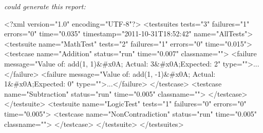 {\itshape could generate this report\+:}

{\itshape 
\begin{DoxyCode}
<?\textcolor{keyword}{xml} \textcolor{keyword}{version}=\textcolor{stringliteral}{"1.0"} \textcolor{keyword}{encoding}=\textcolor{stringliteral}{"UTF-8"}?>
<\textcolor{keywordtype}{testsuites} \textcolor{keyword}{tests}=\textcolor{stringliteral}{"3"} \textcolor{keyword}{failures}=\textcolor{stringliteral}{"1"} \textcolor{keyword}{errors}=\textcolor{stringliteral}{"0"} \textcolor{keyword}{time}=\textcolor{stringliteral}{"0.035"} \textcolor{keyword}{timestamp}=\textcolor{stringliteral}{"2011-10-31T18:52:42"} \textcolor{keyword}{name}=\textcolor{stringliteral}{"AllTests"}>
  <\textcolor{keywordtype}{testsuite} \textcolor{keyword}{name}=\textcolor{stringliteral}{"MathTest"} \textcolor{keyword}{tests}=\textcolor{stringliteral}{"2"} \textcolor{keyword}{failures}=\textcolor{stringliteral}{"1"} \textcolor{keyword}{errors}=\textcolor{stringliteral}{"0"} \textcolor{keyword}{time}=\textcolor{stringliteral}{"0.015"}>
    <\textcolor{keywordtype}{testcase} \textcolor{keyword}{name}=\textcolor{stringliteral}{"Addition"} \textcolor{keyword}{status}=\textcolor{stringliteral}{"run"} \textcolor{keyword}{time}=\textcolor{stringliteral}{"0.007"} \textcolor{keyword}{classname}=\textcolor{stringliteral}{""}>
      <\textcolor{keywordtype}{failure} \textcolor{keyword}{message}=\textcolor{stringliteral}{"Value of: add(1, 1)&#x0A;  Actual: 3&#x0A;Expected: 2"} \textcolor{keyword}{type}=\textcolor{stringliteral}{""}>...</\textcolor{keywordtype}{failure}>
      <\textcolor{keywordtype}{failure} \textcolor{keyword}{message}=\textcolor{stringliteral}{"Value of: add(1, -1)&#x0A;  Actual: 1&#x0A;Expected: 0"} \textcolor{keyword}{type}=\textcolor{stringliteral}{""}>...</\textcolor{keywordtype}{failure}>
    </\textcolor{keywordtype}{testcase}>
    <\textcolor{keywordtype}{testcase} \textcolor{keyword}{name}=\textcolor{stringliteral}{"Subtraction"} \textcolor{keyword}{status}=\textcolor{stringliteral}{"run"} \textcolor{keyword}{time}=\textcolor{stringliteral}{"0.005"} \textcolor{keyword}{classname}=\textcolor{stringliteral}{""}>
    </\textcolor{keywordtype}{testcase}>
  </\textcolor{keywordtype}{testsuite}>
  <\textcolor{keywordtype}{testsuite} \textcolor{keyword}{name}=\textcolor{stringliteral}{"LogicTest"} \textcolor{keyword}{tests}=\textcolor{stringliteral}{"1"} \textcolor{keyword}{failures}=\textcolor{stringliteral}{"0"} \textcolor{keyword}{errors}=\textcolor{stringliteral}{"0"} \textcolor{keyword}{time}=\textcolor{stringliteral}{"0.005"}>
    <\textcolor{keywordtype}{testcase} \textcolor{keyword}{name}=\textcolor{stringliteral}{"NonContradiction"} \textcolor{keyword}{status}=\textcolor{stringliteral}{"run"} \textcolor{keyword}{time}=\textcolor{stringliteral}{"0.005"} \textcolor{keyword}{classname}=\textcolor{stringliteral}{""}>
    </\textcolor{keywordtype}{testcase}>
  </\textcolor{keywordtype}{testsuite}>
</\textcolor{keywordtype}{testsuites}>
\end{DoxyCode}
}

